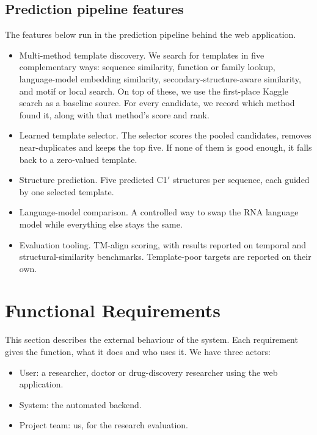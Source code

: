 \documentclass{FastFyp}
\begin{document}
\subsection{Prediction pipeline features}
The features below run in the prediction pipeline behind the web application.
\begin{itemize}
\item Multi-method template discovery. We search for templates in five complementary ways: sequence similarity, function or family lookup, language-model embedding similarity, secondary-structure-aware similarity, and motif or local search. On top of these, we use the first-place Kaggle search as a baseline source. For every candidate, we record which method found it, along with that method's score and rank.
\item Learned template selector. The selector scores the pooled candidates, removes near-duplicates and keeps the top five. If none of them is good enough, it falls back to a zero-valued template.
\item Structure prediction. Five predicted C1$'$ structures per sequence, each guided by one selected template.
\item Language-model comparison. A controlled way to swap the RNA language model while everything else stays the same.
\item Evaluation tooling. TM-align scoring, with results reported on temporal and structural-similarity benchmarks. Template-poor targets are reported on their own.
\end{itemize}

\section{Functional Requirements}
\label{sec:fr}
This section describes the external behaviour of the system. Each requirement gives the function, what it does and who uses it. We have three actors:
\begin{itemize}
\item User: a researcher, doctor or drug-discovery researcher using the web application.
\item System: the automated backend.
\item Project team: us, for the research evaluation.
\end{itemize}
\end{document}
